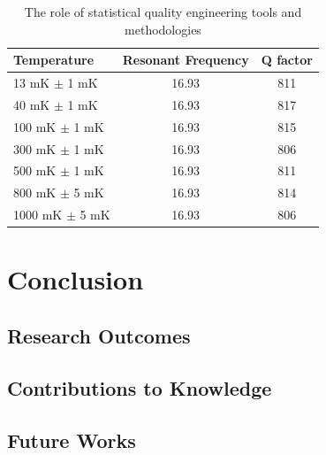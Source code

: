 \documentclass[twoside]{utmthesis}
\begin{document}
\begin{landscape}
\begin{table}[p]
\centering
\caption{The role of statistical quality engineering tools and methodologies}
\vspace{\baselineskip}
\begin{tabular}{l c c}
  \hline
  \hline
  Temperature & Resonant Frequency & Q factor\\
  \hline
  13 mK $\pm$ 1 mK & 16.93 & 811 \\
  40 mK $\pm$ 1 mK & 16.93 & 817 \\
  100 mK $\pm$ 1 mK & 16.93 & 815 \\
  300 mK $\pm$ 1 mK & 16.93 & 806\\
  500 mK $\pm$ 1 mK & 16.93 & 811\\
  800 mK $\pm$ 5 mK & 16.93 & 814\\
  1000 mK $\pm$ 5 mK & 16.93 & 806 \\
  \hline
  \hline
\end{tabular}
\end{table}
\end{landscape}


\chapter{Conclusion}
\section{Research Outcomes}
\section{Contributions to Knowledge}
\section{Future Works}


%



\listofpublications
\end{document}
